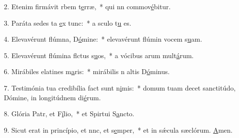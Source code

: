 2. Etenim firmávit rbem t\uline{e}rræ,~* qui nn commov\uline{é}bitur.\par 
3. Paráta sedes ta \uline{e}x tunc:~* a sculo t\uline{u} es.\par 
4. Elevavérunt flúmna, D\uline{ó}mine:~* elevavérunt flúmin vocem s\uline{u}am.\par 
5. Elevavérunt flúmina flctus s\uline{u}os,~* a vócibus arum mult\uline{á}rum.\par 
6. Mirábiles elatines m\uline{a}ris:~* mirábilis n altis D\uline{ó}minus.\par 
7. Testimónia tua credibília fact sunt n\uline{i}mis:~* domum tuam decet sanctitúdo, Dómine, in longitúdnem di\uline{é}rum.\par 
8. Glória Patr, et F\uline{í}lio,~* et Spirtui S\uline{a}ncto.\par 
9. Sicut erat in princípio, et nnc, et s\uline{e}mper,~* et in sǽcula sæclórum. \uline{A}men.\par 
